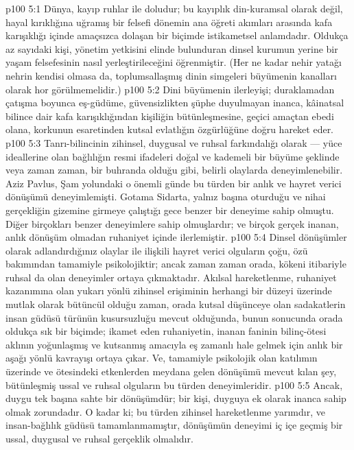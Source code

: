 \vs p100 5:1 Dünya, kayıp ruhlar ile doludur; bu kayıplık din\hyp{}kuramsal olarak değil, hayal kırıklığına uğramış bir felsefi dönemin ana öğreti akımları arasında kafa karışıklığı içinde amaçsızca dolaşan bir biçimde istikametsel anlamdadır. Oldukça az sayıdaki kişi, yönetim yetkisini elinde bulunduran dinsel kurumun yerine bir yaşam felsefesinin nasıl yerleştirileceğini öğrenmiştir. (Her ne kadar nehir yatağı nehrin kendisi olmasa da, toplumsallaşmış dinin simgeleri büyümenin kanalları olarak hor görülmemelidir.)
\vs p100 5:2 Dini büyümenin ilerleyişi; duraklamadan çatışma boyunca eş\hyp{}güdüme, güvensizlikten şüphe duyulmayan inanca, kâinatsal bilince dair kafa karışıklığından kişiliğin bütünleşmesine, geçici amaçtan ebedi olana, korkunun esaretinden kutsal evlatlığın özgürlüğüne doğru hareket eder.
\vs p100 5:3 Tanrı\hyp{}bilincinin zihinsel, duygusal ve ruhsal farkındalığı olarak --- yüce ideallerine olan bağlılığın resmi ifadeleri doğal ve kademeli bir büyüme şeklinde veya zaman zaman, bir buhranda olduğu gibi, belirli olaylarda deneyimlenebilir. Aziz Pavlus, Şam yolundaki o önemli günde bu türden bir anlık ve hayret verici dönüşümü deneyimlemişti. Gotama Sidarta, yalnız başına oturduğu ve nihai gerçekliğin gizemine girmeye çalıştığı gece benzer bir deneyime sahip olmuştu. Diğer birçokları benzer deneyimlere sahip olmuşlardır; ve birçok gerçek inanan, anlık dönüşüm olmadan ruhaniyet içinde ilerlemiştir.
\vs p100 5:4 Dinsel dönüşümler olarak adlandırdığınız olaylar ile ilişkili hayret verici olguların çoğu, özü bakımından tamamiyle psikolojiktir; ancak zaman zaman orada, kökeni itibariyle ruhsal da olan deneyimler ortaya çıkmaktadır. Akılsal hareketlenme, ruhaniyet kazanımına olan yukarı yönlü zihinsel erişiminin herhangi bir düzeyi üzerinde mutlak olarak bütüncül olduğu zaman, orada kutsal düşünceye olan sadakatlerin insan güdüsü türünün kusursuzluğu mevcut olduğunda, bunun sonucunda orada oldukça sık bir biçimde; ikamet eden ruhaniyetin, inanan faninin bilinç\hyp{}ötesi aklının yoğunlaşmış ve kutsanmış amacıyla eş zamanlı hale gelmek için anlık bir aşağı yönlü kavrayışı ortaya çıkar. Ve, tamamiyle psikolojik olan katılımın üzerinde ve ötesindeki etkenlerden meydana gelen dönüşümü mevcut kılan şey, bütünleşmiş ussal ve ruhsal olguların bu türden deneyimleridir.
\vs p100 5:5 Ancak, duygu tek başına sahte bir dönüşümdür; bir kişi, duyguya ek olarak inanca sahip olmak zorundadır. O kadar ki; bu türden zihinsel hareketlenme yarımdır, ve insan\hyp{}bağlılık güdüsü tamamlanmamıştır, dönüşümün deneyimi iç içe geçmiş bir ussal, duygusal ve ruhsal gerçeklik olmalıdır.
